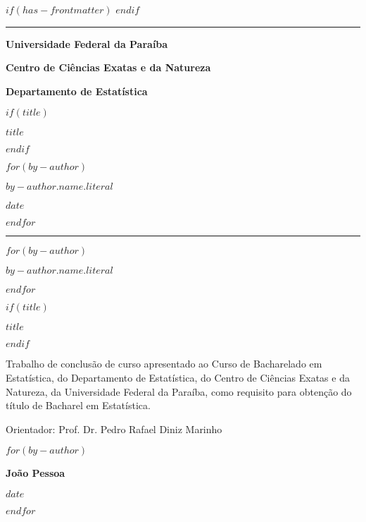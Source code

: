 $if(has-frontmatter)$
$endif$
\cleardoublepage
\thispagestyle{empty}
{\centering
\noindent\rule{\textwidth}{0.5pt}

\vspace{2ex}

{\Large\bfseries Universidade Federal da Paraíba \par}
\vspace{1ex}
{\Large\bfseries Centro de Ciências Exatas e da Natureza \par}
\vspace{1ex}
{\Large\bfseries Departamento de Estatística \par}

\vfill

$if(title)$
{\large\bfseries $title$ \par}
$endif$

\vfill

$for(by-author)$
{\large $by-author.name.literal$ \par}
\vfill
{\normalsize $date$ \par}
$endfor$


\noindent\rule{\textwidth}{0.5pt}

\newpage
\thispagestyle{empty}

$for(by-author)$
{\normalsize\bfseries $by-author.name.literal$ \par}
$endfor$

\vfill

$if(title)$
{\large\bfseries $title$ \par}
$endif$

\vfill

\hfill \parbox{8cm}{\normalsize{Trabalho de conclusão de curso apresentado ao Curso de Bacharelado em Estatística, do Departamento de Estatística, do Centro de Ciências Exatas e da Natureza, da Universidade Federal da Paraíba, como requisito para obtenção do título de Bacharel em Estatística.}}

\vfill

{\normalsize Orientador: Prof. Dr. Pedro Rafael Diniz Marinho}

\vfill

$for(by-author)$
{\normalsize\bfseries João Pessoa \par}
{\normalsize\bfseries $date$ \par}
$endfor$

}
